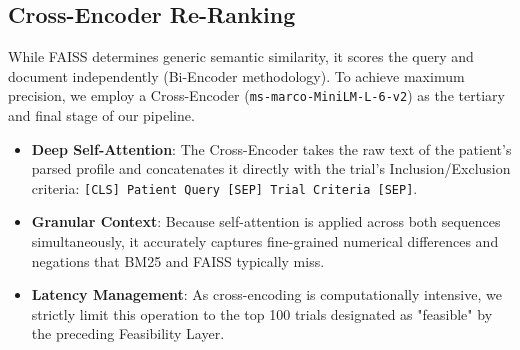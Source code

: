 \documentclass[11pt]{article}
\begin{document}
\subsection{Cross-Encoder Re-Ranking}
While FAISS determines generic semantic similarity, it scores the query and document independently (Bi-Encoder methodology). To achieve maximum precision, we employ a Cross-Encoder (\texttt{ms-marco-MiniLM-L-6-v2}) as the tertiary and final stage of our pipeline.
\begin{itemize}
    \item \textbf{Deep Self-Attention}: The Cross-Encoder takes the raw text of the patient's parsed profile and concatenates it directly with the trial's Inclusion/Exclusion criteria: \texttt{[CLS] Patient Query [SEP] Trial Criteria [SEP]}.
    \item \textbf{Granular Context}: Because self-attention is applied across both sequences simultaneously, it accurately captures fine-grained numerical differences and negations that BM25 and FAISS typically miss.
    \item \textbf{Latency Management}: As cross-encoding is computationally intensive, we strictly limit this operation to the top 100 trials designated as "feasible" by the preceding Feasibility Layer. 
\end{itemize}
\end{document}
